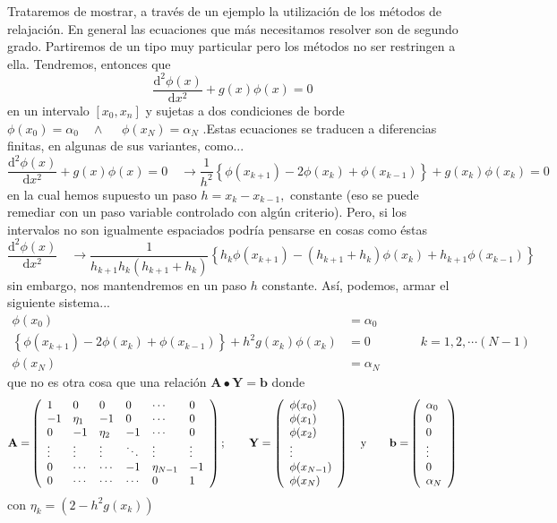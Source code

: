 \documentclass[spanish,titlepage,11pt]{article}
\begin{document}
Trataremos de mostrar, a trav\'{e}s de un ejemplo la utilizaci\'{o}n de los
m\'{e}todos de relajaci\'{o}n. En general las ecuaciones que m\'{a}s
necesitamos resolver son de segundo grado. Partiremos de un tipo muy
particular pero los m\'{e}todos no ser restringen a ella. Tendremos, entonces
que
\[
\frac{\mathrm{d}^{2}\phi(x)}{\mathrm{d}x^{2}}+g(x)\phi(x)=0
\]
en un intervalo $\left[  x_{0},x_{n}\right]  $ y sujetas a dos condiciones de
borde $\phi(x_{0})=\alpha_{0}\quad\wedge\quad$ $\phi(x_{N})=\alpha_{N} $
.Estas ecuaciones se traducen a diferencias finitas, en algunas de sus
variantes, como...
\[
\frac{\mathrm{d}^{2}\phi(x)}{\mathrm{d}x^{2}}+g(x)\phi(x)=0\quad
\rightarrow\frac{1}{h^{2}}\left\{  \phi(x_{k+1})-2\phi(x_{k})+\phi
(x_{k-1})\right\}  +g(x_{k})\phi(x_{k})=0
\]
en la cual hemos supuesto un paso $h=x_{k}-x_{k-1},$ constante (eso se puede
remediar con un paso variable controlado con alg\'{u}n criterio). Pero, si los
intervalos no son igualmente espaciados podr\'{i}a pensarse en cosas como
\'{e}stas
\[
\frac{\mathrm{d}^{2}\phi(x)}{\mathrm{d}x^{2}}\quad\rightarrow\frac{1}%
{h_{k+1}h_{k}\left(  h_{k+1}+h_{k}\right)  }\left\{  h_{k}\phi(x_{k+1}%
)-\left(  h_{k+1}+h_{k}\right)  \phi(x_{k})+h_{k+1}\phi(x_{k-1})\right\}
\]
sin embargo, nos mantendremos en un paso $h$ constante. As\'{i}, podemos,
armar el siguiente sistema...
\begin{align*}
\phi(x_{0})  &  =\alpha_{0}\\
\left\{  \phi(x_{k+1})-2\phi(x_{k})+\phi(x_{k-1})\right\}  +h^{2}g(x_{k}%
)\phi(x_{k})  &  =0\qquad\qquad k=1,2,\cdots\left(  N-1\right) \\
\phi(x_{N})  &  =\alpha_{N}%
\end{align*}
que no es otra cosa que una relaci\'{o}n \qquad$\mathbf{A\bullet Y=b}$ donde
\[
\mathbf{A=}\left(
\begin{array}
[c]{llllll}%
1 & 0 & 0 & 0 & \cdots & 0\\
-1 & \eta_{1} & -1 & 0 & \cdots & 0\\
0 & -1 & \eta_{2} & -1 & \cdots & 0\\
\vdots & \vdots & \vdots & \ddots & \vdots & \vdots\\
0 & \cdots & \cdots & -1 & \eta_{N-1} & -1\\
0 & \cdots & \cdots & \cdots & 0 & 1
\end{array}
\right)  ;\qquad\mathbf{Y}=\left(
\begin{array}
[c]{l}%
\phi(x_{0})\\
\phi(x_{1})\\
\phi(x_{2})\\
\vdots\\
\phi(x_{N-1})\\
\phi(x_{N})
\end{array}
\right)  \quad\mathrm{y\qquad}\mathbf{b=}\left(
\begin{array}
[c]{l}%
\alpha_{0}\\
0\\
0\\
\vdots\\
0\\
\alpha_{N}%
\end{array}
\right)
\]
con $\eta_{k}=\left(  2-h^{2}g(x_{k})\right)  $
\end{document}
